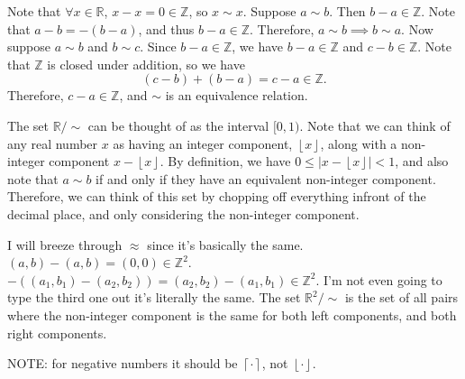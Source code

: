 \documentclass[11pt]{report}
\newcommand{\tildesim}{\mathbin{\sim}}
\begin{document}
\begin{solution}
	Note that $\forall x\in\mathbb{R}$, $x-x=0\in\mathbb{Z}$, so $x\sim x$. Suppose $a\sim b$. Then $b-a\in\mathbb{Z}$. Note that $a-b=-(b-a)$, and thus $b-a\in\mathbb{Z}$. Therefore, $a\sim b\implies b\sim a$. Now suppose $a\sim b$ and $b\sim c$. Since $b-a\in\mathbb{Z}$, we have $b-a\in\mathbb{Z}$ and $c-b\in\mathbb{Z}$. Note that $\mathbb{Z}$ is closed under addition, so we have
	\[
		(c-b)+(b-a)=c-a\in\mathbb{Z}
	.\]
	Therefore, $c-a\in\mathbb{Z}$, and $\sim $ is an equivalence relation.

	The set $\mathbb{R} /\tildesim $ can be thought of as the interval $[0,1)$. Note that we can think of any real number $x$ as having an integer component, $\left\lfloor x \right\rfloor$, along with a non-integer component $x-\left\lfloor x \right\rfloor$. By definition, we have $0\leq \left|x- \left\lfloor x \right\rfloor \right| <1$, and also note that $a\sim b$ if and only if they have an equivalent non-integer component. Therefore, we can think of this set by chopping off everything infront of the decimal place, and only considering the non-integer component.

	I will breeze through $\approx $ since it's basically the same. $(a,b)-(a,b)=(0,0)\in\mathbb{Z}^2$. $-((a_1,b_1)-(a_2,b_2))=(a_2,b_2)-(a_1,b_1)\in\mathbb{Z}^2$. I'm not even going to type the third one out it's literally the same. The set $\mathbb{R}^2 /\tildesim $ is the set of all pairs where the non-integer component is the same for both left components, and both right components.

	NOTE: for negative numbers it should be $\left\lceil \cdot  \right\rceil $, not $\left\lfloor \cdot  \right\rfloor$.
\end{solution}
\end{document}
